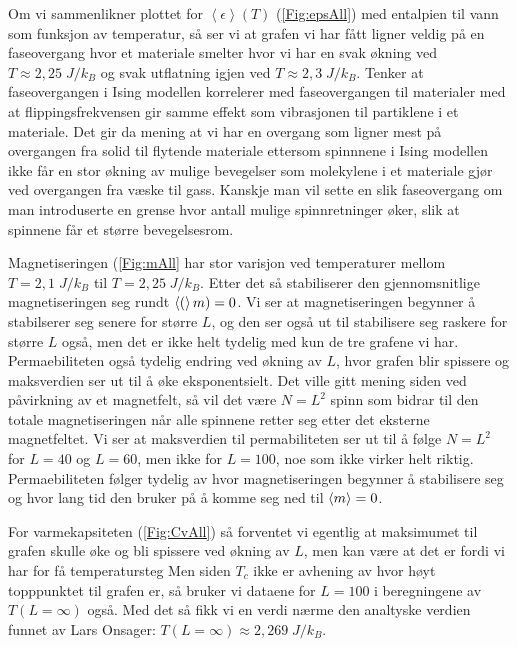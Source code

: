 \documentclass[reprint,english,notitlepage]{revtex4-1}  %
\begin{document}
Om vi sammenlikner plottet for $\left < \epsilon \right > (T)$ (\autoref{Fig:epsAll}) med entalpien til vann som funksjon av temperatur, så ser vi at grafen vi har fått ligner veldig på en faseovergang hvor et materiale smelter hvor vi har en svak økning ved $T \approx 2,25 \; J/k_B$ og svak utflatning igjen ved $T \approx 2,3 \; J/k_B$. Tenker at faseovergangen i Ising modellen korrelerer med faseovergangen til materialer med at flippingsfrekvensen gir samme effekt som vibrasjonen til partiklene i et materiale. Det gir da mening at vi har en overgang som ligner mest på overgangen fra solid til flytende materiale ettersom spinnnene i Ising modellen ikke får en stor økning av mulige bevegelser som molekylene i et materiale gjør ved overgangen fra væske til gass. Kanskje man vil sette en slik faseovergang om man introduserte en grense hvor antall mulige spinnretninger øker, slik at spinnene får et større bevegelsesrom.

Magnetiseringen (\autoref{Fig:mAll} har stor varisjon ved temperaturer mellom $T = 2,1 \; J/k_B$ til $T = 2,25 \; J/k_B$. Etter det så stabiliserer den gjennomsnitlige magnetiseringen seg rundt $ \expval(m) = 0$. Vi ser at magnetiseringen begynner å stabilserer seg senere for større $L$, og den ser også ut til stabilisere seg raskere for større $L$ også, men det er ikke helt tydelig med kun de tre grafene vi har. Permaebiliteten også tydelig endring ved økning av $L$, hvor grafen blir spissere og maksverdien ser ut til å øke eksponentsielt. Det ville gitt mening siden ved påvirkning av et magnetfelt, så vil det være $N = L^2$ spinn som bidrar til den totale magnetiseringen når alle spinnene retter seg etter det eksterne magnetfeltet. Vi ser at maksverdien til permabiliteten ser ut til å følge $N = L^2$ for $L = 40$ og $L = 60$, men ikke for $L = 100$, noe som ikke virker helt riktig. Permaebiliteten følger tydelig av hvor magnetiseringen begynner å stabilisere seg og hvor lang tid den bruker på å komme seg ned til $\expval{m} = 0$. 

For varmekapsiteten (\autoref{Fig:CvAll}) så forventet vi egentlig at maksimumet til grafen skulle øke og bli spissere ved økning av $L$, men kan være at det er fordi vi har for få temperatursteg  Men siden  $T_c$ ikke er avhening av hvor høyt topppunktet til grafen er, så bruker vi dataene for $L = 100$ i beregningene av $T \left ( L = \infty \right ) $ også. Med det så fikk vi en verdi nærme den analtyske verdien funnet av Lars Onsager: $T \left ( L = \infty \right ) \approx 2,269 \; J/k_B$.
\end{document}
